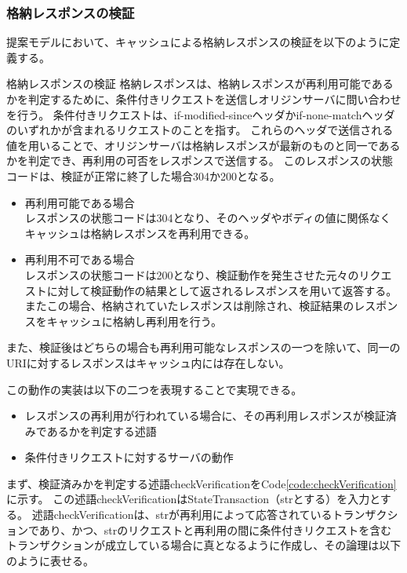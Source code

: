 \documentclass[12pt,a4paper]{jbook}
\begin{document}
\subsubsection{格納レスポンスの検証}
提案モデルにおいて、キャッシュによる格納レスポンスの検証を以下のように定義する。

\begin{itembox}[l]{格納レスポンスの検証}
格納レスポンスは、格納レスポンスが再利用可能であるかを判定するために、条件付きリクエストを送信しオリジンサーバに問い合わせを行う。
条件付きリクエストは、if-modified-sinceヘッダかif-none-matchヘッダのいずれかが含まれるリクエストのことを指す。
これらのヘッダで送信される値を用いることで、オリジンサーバは格納レスポンスが最新のものと同一であるかを判定でき、再利用の可否をレスポンスで送信する。
このレスポンスの状態コードは、検証が正常に終了した場合304か200となる。
\begin{itemize}
\item 再利用可能である場合 \\
レスポンスの状態コードは304となり、そのヘッダやボディの値に関係なくキャッシュは格納レスポンスを再利用できる。
\item 再利用不可である場合 \\
レスポンスの状態コードは200となり、検証動作を発生させた元々のリクエストに対して検証動作の結果として返されるレスポンスを用いて返答する。
またこの場合、格納されていたレスポンスは削除され、検証結果のレスポンスをキャッシュに格納し再利用を行う。
\end{itemize}
また、検証後はどちらの場合も再利用可能なレスポンスの一つを除いて、同一のURIに対するレスポンスはキャッシュ内には存在しない。
\end{itembox}

この動作の実装は以下の二つを表現することで実現できる。
\begin{itemize}
\item レスポンスの再利用が行われている場合に、その再利用レスポンスが検証済みであるかを判定する述語
\item 条件付きリクエストに対するサーバの動作
\end{itemize}

まず、検証済みかを判定する述語checkVerificationをCode\ref{code:checkVerification}に示す。
この述語checkVerificationはStateTransaction（strとする）を入力とする。
述語checkVerificationは、strが再利用によって応答されているトランザクションであり、かつ、strのリクエストと再利用の間に条件付きリクエストを含むトランザクションが成立している場合に真となるように作成し、その論理は以下のように表せる。
\end{document}
